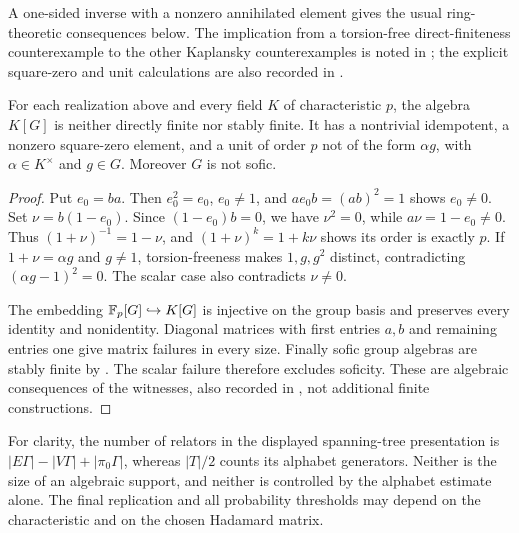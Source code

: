 A one-sided inverse with a nonzero annihilated element gives the usual ring-theoretic consequences below. The implication from a torsion-free direct-finiteness counterexample to the other Kaplansky counterexamples is noted in \cite[Section~1]{BFF24}; the explicit square-zero and unit calculations are also recorded in \cite[Lemmas~2.1--2.2]{MD26}.

\begin{corollary}\label{cor:algebra}
For each realization above and every field $K$ of characteristic $p$, the algebra $K[G]$ is neither directly finite nor stably finite. It has a nontrivial idempotent, a nonzero square-zero element, and a unit of order $p$ not of the form $\alpha g$, with $\alpha\in K^\times$ and $g\in G$. Moreover $G$ is not sofic.
\end{corollary}
\begin{proof}
Put $e_0=ba$. Then $e_0^2=e_0$, $e_0\ne1$, and $ae_0b=(ab)^2=1$ shows $e_0\ne0$. Set $\nu=b(1-e_0)$. Since $(1-e_0)b=0$, we have $\nu^2=0$, while $a\nu=1-e_0\ne0$. Thus $(1+\nu)^{-1}=1-\nu$, and $(1+\nu)^k=1+k\nu$ shows its order is exactly $p$. If $1+\nu=\alpha g$ and $g\ne1$, torsion-freeness makes $1,g,g^2$ distinct, contradicting $(\alpha g-1)^2=0$. The scalar case also contradicts $\nu\ne0$.

The embedding $\mathbb F_p[G]\hookrightarrow K[G]$ is injective on the group basis and preserves every identity and nonidentity. Diagonal matrices with first entries $a,b$ and remaining entries one give matrix failures in every size. Finally sofic group algebras are stably finite by \cite[Corollary~4.7 in the preprint]{ES04}. The scalar failure therefore excludes soficity. These are algebraic consequences of the witnesses, also recorded in \cite[Section~2]{MD26}, not additional finite constructions.
\end{proof}

For clarity, the number of relators in the displayed spanning-tree presentation is $|E\Gamma|-|V\Gamma|+|\pi_0\Gamma|$, whereas $|T|/2$ counts its alphabet generators. Neither is the size of an algebraic support, and neither is controlled by the alphabet estimate alone. The final replication and all probability thresholds may depend on the characteristic and on the chosen Hadamard matrix.
